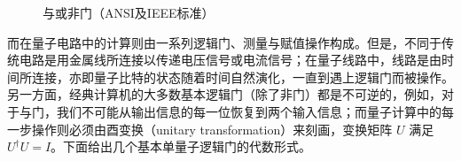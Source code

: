 \begin{figure}[htbp]
    \label{fig:and-or-not-gate}  %
    \centering    %

    \caption{与或非门（ANSI及IEEE标准）} %
\end{figure}

而在量子电路中的计算则由一系列逻辑门、测量与赋值操作构成。但是，不同于传统电路是用金属线所连接以传递电压信号或电流信号；在量子线路中，线路是由时间所连接，亦即量子比特的状态随着时间自然演化，一直到遇上逻辑门而被操作。另一方面，经典计算机的大多数基本逻辑门（除了非门）都是不可逆的，例如，对于与门，我们不可能从输出信息的每一位恢复到两个输入信息；而量子计算中的每一步操作则必须由酉变换（unitary transformation）来刻画\cite{von2018mathematical}，变换矩阵 $U$ 满足 $U^\dagger U=I$。下面给出几个基本单量子逻辑门的代数形式。

